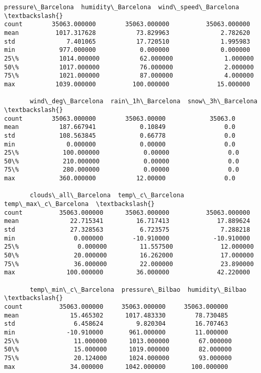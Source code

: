 \documentclass[11pt]{article}
\begin{document}
\begin{tcolorbox}[breakable, size=fbox, boxrule=.5pt, pad at break*=1mm, opacityfill=0]
\begin{Verbatim}[commandchars=\\\{\}]
       pressure\_Barcelona  humidity\_Barcelona  wind\_speed\_Barcelona  \textbackslash{}
count        35063.000000        35063.000000          35063.000000
mean          1017.317628           73.829963              2.782620
std              7.401065           17.720510              1.995983
min            977.000000            0.000000              0.000000
25\%           1014.000000           62.000000              1.000000
50\%           1017.000000           76.000000              2.000000
75\%           1021.000000           87.000000              4.000000
max           1039.000000          100.000000             15.000000

       wind\_deg\_Barcelona  rain\_1h\_Barcelona  snow\_3h\_Barcelona  \textbackslash{}
count        35063.000000        35063.00000            35063.0
mean           187.667941            0.10849                0.0
std            108.563845            0.66778                0.0
min              0.000000            0.00000                0.0
25\%            100.000000            0.00000                0.0
50\%            210.000000            0.00000                0.0
75\%            280.000000            0.00000                0.0
max            360.000000           12.00000                0.0

       clouds\_all\_Barcelona  temp\_c\_Barcelona  temp\_max\_c\_Barcelona  \textbackslash{}
count          35063.000000      35063.000000          35063.000000
mean              22.715341         16.717413             17.889624
std               27.328563          6.723575              7.288218
min                0.000000        -10.910000            -10.910000
25\%                0.000000         11.557500             12.000000
50\%               20.000000         16.262000             17.000000
75\%               36.000000         22.000000             23.890000
max              100.000000         36.000000             42.220000

       temp\_min\_c\_Barcelona  pressure\_Bilbao  humidity\_Bilbao  \textbackslash{}
count          35063.000000     35063.000000     35063.000000
mean              15.465302      1017.483330        78.730485
std                6.458624         9.820304        16.707463
min              -10.910000       961.000000        11.000000
25\%               11.000000      1013.000000        67.000000
50\%               15.000000      1019.000000        82.000000
75\%               20.124000      1024.000000        93.000000
max               34.000000      1042.000000       100.000000


\end{Verbatim}
\end{tcolorbox}
\end{document}
